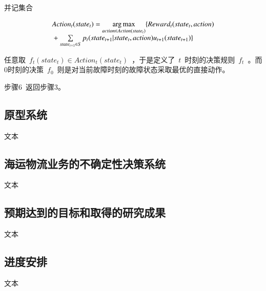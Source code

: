 并记集合

\begin{equation}\label{equation:backward_mdp_arg}
\begin{array}{l}
Actio{n_t}(stat{e_t}) = \mathop {\arg \max }\limits_{action \in Action(stat{e_t})} \{ Rewar{d_t}(stat{e_t},action)\\
{\rm{                       }} + \sum\limits_{stat{e_{t + 1}} \in S} {{p_t}(stat{e_{t + 1}}|stat{e_t},action){u_{t + 1}}(stat{e_{t + 1}})} \} 
\end{array}
\end{equation}

任意取~$f_t(state_t) \in Action_t(state_t)$~，于是定义了~$t$~时刻的决策规则~$f_t$~。而0时刻的决策~$f_0$~则是对当前故障时刻的故障状态采取最优的直接动作。

步骤6~返回步骤3。


\subsection{原型系统}
文本

\subsection{海运物流业务的不确定性决策系统}
文本


\subsection{预期达到的目标和取得的研究成果}
文本

\subsection{进度安排}
文本
